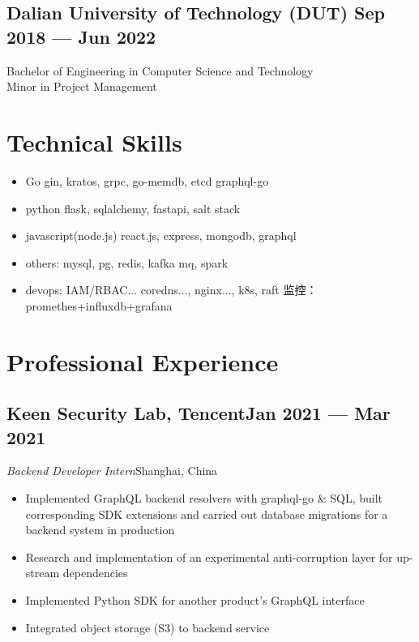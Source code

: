 \documentclass[a4,12pt]{article}
\newcommand{\subtext}[1]{
#1\par\vspace{-0.3cm}}
\newenvironment{zitemize}{
\begin{itemize}\itemsep0pt \parskip0pt \parsep1pt}
{\end{itemize}\vspace{-0.5cm}}
\begin{document}
\vspace{-0.3cm}
\subsection*{Dalian University of Technology (DUT) \hfill \textbf{Sep 2018 --- Jun 2022}}
Bachelor of Engineering in Computer Science and Technology\\
Minor in Project Management\\




\vspace{-0.4cm}

\section{\textbf{Technical Skills}}
\begin{zitemize}
    \item Go gin, kratos, grpc, go-memdb, etcd graphql-go
    \item python flask, sqlalchemy, fastapi, salt stack
    \item javascript(node.js) react.js, express, mongodb, graphql
    \item others: mysql, pg, redis, kafka mq, spark
    \item devops: IAM/RBAC... coredns..., nginx..., k8s, raft 监控：promethes+influxdb+grafana
\end{zitemize}

\section{\textbf{Professional Experience}}
        

\subsection*{Keen Security Lab, Tencent\hfill Jan 2021 --- Mar 2021} 
\subtext{\textit{Backend Developer Intern}\hfill Shanghai, China} 
    \begin{zitemize}
        \item Implemented GraphQL backend resolvers with graphql-go \& SQL, built corresponding SDK extensions and carried out database migrations for a backend system in production
        \item Research and implementation of an experimental anti-corruption layer for up-stream dependencies
        \item Implemented Python SDK for another product's GraphQL interface
        \item Integrated object storage (S3) to backend service
    \end{zitemize}
\end{document}
